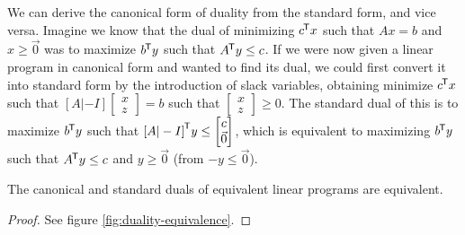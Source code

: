 \begin{rmk}
    We can derive the canonical form of duality from the standard form, and vice versa. Imagine we know that the dual of minimizing ${c}^{\mkern-1.5mu\mathsf{T}}x$ such that $Ax = b$ and $x \geq \vec{0}$ was to maximize ${b}^{\mkern-1.5mu\mathsf{T}}y$ such that ${A}^{\mkern-1.5mu\mathsf{T}}y \leq c$. If we were now given a linear program in canonical form and wanted to find its dual, we could first convert it into standard form by the introduction of slack variables, obtaining minimize ${c}^{\mkern-1.5mu\mathsf{T}}x$ such that $[A|-I]\begin{bmatrix}x \\ z\end{bmatrix} = b$ such that $\begin{bmatrix}x \\ z\end{bmatrix} \geq 0$. The standard dual of this is to maximize ${b}^{\mkern-1.5mu\mathsf{T}}y$ such that ${[A|-I]}^{\mkern-1.5mu\mathsf{T}}y \leq \begin{bmatrix}c \\ \vec{0}\end{bmatrix}$, which is equivalent to maximizing ${b}^{\mkern-1.5mu\mathsf{T}}y$ such that ${A}^{\mkern-1.5mu\mathsf{T}}y \leq c$ and $y \geq \vec{0}$ (from $-y \leq \vec{0}$).
\end{rmk}

\begin{prop}
    The canonical and standard duals of equivalent linear programs are equivalent.
\end{prop}

\begin{proof}
    See figure \ref{fig:duality-equivalence}.
\end{proof}

